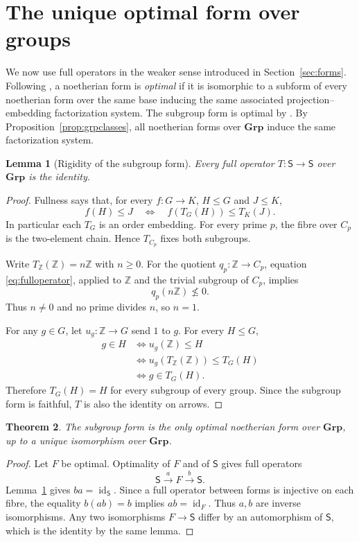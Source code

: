 \documentclass[12pt,a4paper]{amsart}
\newtheorem{theorem}{Theorem}[section]
\newtheorem{lemma}[theorem]{Lemma}
\theoremstyle{definition}
\newcommand{\Grp}{\mathbf{Grp}}
\newcommand{\id}{\operatorname{id}}
\newcommand{\Z}{\mathbb Z}
\begin{document}
\section{The unique optimal form over groups}\label{sec:optimal}

We now use full operators in the weaker sense introduced in Section~\ref{sec:forms}. Following \cite{JV}, a noetherian form is \emph{optimal} if it is isomorphic to a subform of every noetherian form over the same base inducing the same associated projection--embedding factorization system. The subgroup form is optimal by \cite{JV}. By Proposition~\ref{prop:grpclasses}, all noetherian forms over $\Grp$ induce the same factorization system.

\begin{lemma}[Rigidity of the subgroup form]\label{lem:rigidity}
Every full operator $T:\mathsf S\to\mathsf S$ over $\Grp$ is the identity.
\end{lemma}
\begin{proof}
Fullness says that, for every $f:G\to K$, $H\leq G$ and $J\leq K$,
\begin{equation}\label{eq:fulloperator}
 f(H)\leq J
       \quad\Longleftrightarrow\quad
 f(T_G(H))\leq T_K(J).
\end{equation}
In particular each $T_G$ is an order embedding. For every prime $p$, the fibre over $C_p$ is the two-element chain. Hence $T_{C_p}$ fixes both subgroups.

Write $T_\Z(\Z)=n\Z$ with $n\geq0$. For the quotient $q_p:\Z\to C_p$, equation \eqref{eq:fulloperator}, applied to $\Z$ and the trivial subgroup of $C_p$, implies
\[
                           q_p(n\Z)\nleq0.
\]
Thus $n\neq0$ and no prime divides $n$, so $n=1$.

For any $g\in G$, let $u_g:\Z\to G$ send $1$ to $g$. For every $H\leq G$,
\[
 \begin{aligned}
 g\in H
 &\Longleftrightarrow u_g(\Z)\leq H\\
 &\Longleftrightarrow u_g(T_\Z(\Z))\leq T_G(H)\\
 &\Longleftrightarrow g\in T_G(H).
 \end{aligned}
\]
Therefore $T_G(H)=H$ for every subgroup of every group. Since the subgroup form is faithful, $T$ is also the identity on arrows.
\end{proof}

\begin{theorem}\label{thm:optimal}
The subgroup form is the only optimal noetherian form over $\Grp$, up to a unique isomorphism over $\Grp$.
\end{theorem}
\begin{proof}
Let $F$ be optimal. Optimality of $F$ and of $\mathsf S$ gives full operators
\[
                       \mathsf S\xrightarrow{a}F
                           \xrightarrow{b}\mathsf S.
\]
Lemma~\ref{lem:rigidity} gives $ba=\id_{\mathsf S}$. Since a full operator between forms is injective on each fibre, the equality
$b(ab)=b$ implies $ab=\id_F$. Thus $a,b$ are inverse isomorphisms. Any two isomorphisms $F\to\mathsf S$ differ by an automorphism of $\mathsf S$, which is the identity by the same lemma.
\end{proof}
\end{document}
